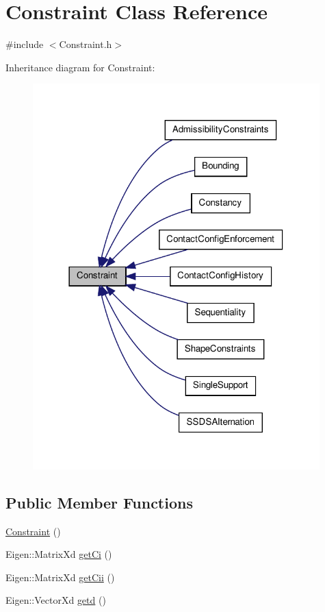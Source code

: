 \hypertarget{classConstraint}{\section{\-Constraint \-Class \-Reference}
\label{classConstraint}
}


{\ttfamily \#include $<$\-Constraint.\-h$>$}



\-Inheritance diagram for \-Constraint\-:
\nopagebreak
\begin{figure}[H]
\begin{center}
\leavevmode
\includegraphics[width=314pt]{classConstraint__inherit__graph}
\end{center}
\end{figure}
\subsection*{\-Public \-Member \-Functions}
\begin{DoxyCompactItemize}
\item 
\hyperlink{classConstraint_ac066210c674e540f0d2570f53d6eff7b}{\-Constraint} ()
\item 
\-Eigen\-::\-Matrix\-Xd \hyperlink{classConstraint_a9617822e8e1145177f41775748810ef6}{get\-Ci} ()
\item 
\-Eigen\-::\-Matrix\-Xd \hyperlink{classConstraint_abc5587e865eebb1ac924ce06e982117e}{get\-Cii} ()
\item 
\-Eigen\-::\-Vector\-Xd \hyperlink{classConstraint_a6498cc7d4a96baa9158c6e38384364d5}{getd} ()
\end{DoxyCompactItemize}

